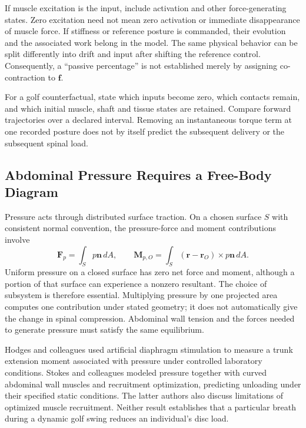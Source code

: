 If muscle excitation is the input, include activation and other force-generating states. Zero excitation need not mean zero activation or immediate disappearance of muscle force. If stiffness or reference posture is commanded, their evolution and the associated work belong in the model. The same physical behavior can be split differently into drift and input after shifting the reference control. Consequently, a ``passive percentage'' is not established merely by assigning co-contraction to $\bm f$.

For a golf counterfactual, state which inputs become zero, which contacts remain, and which initial muscle, shaft and tissue states are retained. Compare forward trajectories over a declared interval. Removing an instantaneous torque term at one recorded posture does not by itself predict the subsequent delivery or the subsequent spinal load.

\subsection{Abdominal Pressure Requires a Free-Body Diagram}
Pressure acts through distributed surface traction. On a chosen surface $S$ with consistent normal convention, the pressure-force and moment contributions involve
\begin{equation}
\bm F_p=\int_S p\bm n\,dA,\qquad
\bm M_{p,O}=\int_S(\bm r-\bm r_O)\times p\bm n\,dA.
\end{equation}
Uniform pressure on a closed surface has zero net force and moment, although a portion of that surface can experience a nonzero resultant. The choice of subsystem is therefore essential. Multiplying pressure by one projected area computes one contribution under stated geometry; it does not automatically give the change in spinal compression. Abdominal wall tension and the forces needed to generate pressure must satisfy the same equilibrium.

Hodges and colleagues used artificial diaphragm stimulation to measure a trunk extension moment associated with pressure under controlled laboratory conditions. Stokes and colleagues modeled pressure together with curved abdominal wall muscles and recruitment optimization, predicting unloading under their specified static conditions. The latter authors also discuss limitations of optimized muscle recruitment. Neither result establishes that a particular breath during a dynamic golf swing reduces an individual's disc load. \citep{Hodges2001IAPMoment,Stokes2010AbdominalPressure}

